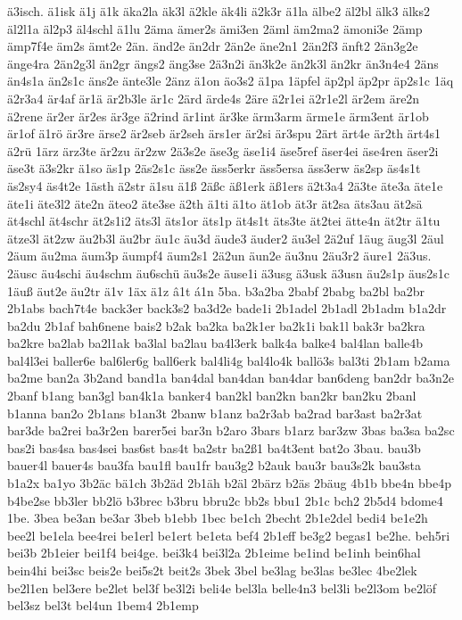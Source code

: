 {ä3isch.
ä1isk
ä1j
ä1k
äka2la
äk3l
ä2kle
äk4li
ä2k3r
ä1la
älbe2
äl2bl
älk3
älks2
äl2l1a
äl2p3
äl4schl
ä1lu
2äma
ämer2s
ämi3en
2äml
äm2ma2
ämoni3e
2ämp
ämp7f4e
äm2s
ämt2e
2än.
änd2e
än2dr
2än2e
äne2n1
2än2f3
änft2
2än3g2e
änge4ra
2än2g3l
än2gr
ängs2
äng3se
2ä3n2i
än3k2e
än2k3l
än2kr
än3n4e4
2äns
än4s1a
än2s1c
äns2e
änte3le
2änz
ä1on
äo3s2
ä1pa
1äpfel
äp2pl
äp2pr
äp2s1c
1äq
ä2r3a4
är4af
är1ä
är2b3le
är1c
2ärd
ärde4s
2äre
ä2r1ei
ä2r1e2l
är2em
äre2n
ä2rene
är2er
är2es
är3ge
ä2rind
är1int
är3ke
ärm3arm
ärme1e
ärm3ent
är1ob
är1of
ä1rö
är3re
ärse2
är2seb
är2seh
ärs1er
är2si
är3spu
2ärt
ärt4e
är2th
ärt4s1
ä2rü
1ärz
ärz3te
är2zu
är2zw
2ä3s2e
äse3g
äse1i4
äse5ref
äser4ei
äse4ren
äser2i
äse3t
ä3s2kr
ä1so
äs1p
2äs2s1c
äss2e
äss5erkr
äss5ersa
äss3erw
äs2sp
äs4s1t
äs2sy4
äs4t2e
1ästh
ä2str
ä1su
ä1ß
2äßc
äß1erk
äß1ers
ä2t3a4
2ä3te
äte3a
äte1e
äte1i
äte3l2
äte2n
äteo2
äte3se
ä2th
ä1ti
ä1to
ät1ob
ät3r
ät2sa
äts3au
ät2sä
ät4schl
ät4schr
ät2s1i2
äts3l
äts1or
äts1p
ät4s1t
äts3te
ät2tei
ätte4n
ät2tr
ä1tu
ätze3l
ät2zw
äu2b3l
äu2br
äu1c
äu3d
äude3
äuder2
äu3el
2ä2uf
1äug
äug3l
2äul
2äum
äu2ma
äum3p
äumpf4
äum2s1
2ä2un
äun2e
äu3nu
2äu3r2
äure1
2ä3us.
2äusc
äu4schi
äu4schm
äu6schü
äu3s2e
äuse1i
ä3usg
ä3usk
ä3usn
äu2s1p
äus2s1c
1äuß
äut2e
äu2tr
ä1v
1äx
ä1z
â1t
á1n
5ba.
b3a2ba
2babf
2babg
ba2bl
ba2br
2b1abs
bach7t4e
back3er
back3s2
ba3d2e
bade1i
2b1adel
2b1adl
2b1adm
b1a2dr
ba2du
2b1af
bah6nene
bais2
b2ak
ba2ka
ba2k1er
ba2k1i
bak1l
bak3r
ba2kra
ba2kre
ba2lab
ba2l1ak
ba3lal
ba2lau
ba4l3erk
balk4a
balke4
bal4lan
balle4b
bal4l3ei
baller6e
bal6ler6g
ball6erk
bal4li4g
bal4lo4k
ballö3s
bal3ti
2b1am
b2ama
ba2me
ban2a
3b2and
band1a
ban4dal
ban4dan
ban4dar
ban6deng
ban2dr
ba3n2e
2banf
b1ang
ban3gl
ban4k1a
banker4
ban2kl
ban2kn
ban2kr
ban2ku
2banl
b1anna
ban2o
2b1ans
b1an3t
2banw
b1anz
ba2r3ab
ba2rad
bar3ast
ba2r3at
bar3de
ba2rei
ba3r2en
barer5ei
bar3n
b2aro
3bars
b1arz
bar3zw
3bas
ba3sa
ba2sc
bas2i
bas4sa
bas4sei
bas6st
bas4t
ba2str
ba2ß1
ba4t3ent
bat2o
3bau.
bau3b
bauer4l
bauer4s
bau3fa
bau1fl
bau1fr
bau3g2
b2auk
bau3r
bau3s2k
bau3sta
b1a2x
ba1yo
3b2äc
bä1ch
3b2äd
2b1äh
b2äl
2bärz
b2äs
2bäug
4b1b
bbe4n
bbe4p
b4be2se
bb3ler
bb2lö
b3brec
b3bru
bbru2c
bb2s
bbu1
2b1c
bch2
2b5d4
bdome4
1be.
3bea
be3an
be3ar
3beb
b1ebb
1bec
be1ch
2becht
2b1e2del
bedi4
be1e2h
bee2l
be1ela
bee4rei
be1erl
be1ert
be1eta
bef4
2b1eff
be3g2
begas1
be2he.
beh5ri
bei3b
2b1eier
bei1f4
bei4ge.
bei3k4
bei3l2a
2b1eime
be1ind
be1inh
bein6hal
bein4hi
bei3sc
beis2e
bei5s2t
beit2s
3bek
3bel
be3lag
be3las
be3lec
4be2lek
be2l1en
bel3ere
be2let
bel3f
be3l2i
beli4e
bel3la
belle4n3
bel3li
be2l3om
be2löf
bel3sz
bel3t
bel4un
1bem4
2b1emp
}
